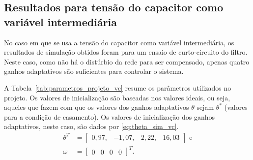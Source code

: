   \newpage

  \vfill
  \noindent
  \begin{minipage}{\textwidth}
    \makebox[\textwidth]{
      \centering
      \def\svgwidth{\textwidth}
      }
    \label{fig:up_sim_Lg}
  \end{minipage}

  \vfill
  \noindent
  \begin{minipage}{\textwidth}
    \makebox[\textwidth]{
      \centering
      \def\svgwidth{\textwidth}
      }
    \label{fig:thetas_sim_Lg}
  \end{minipage}

  \vfill

  \newpage

  \subsection{Resultados para tensão do capacitor como variável intermediária}

  No caso em que se usa a tensão do capacitor como variável intermediária, os resultados de simulação obtidos foram para um ensaio de curto-circuito do filtro. Neste caso, como não há o distúrbio da rede para ser compensado, apenas quatro ganhos adaptativos são suficientes para controlar o sistema.

  A Tabela~\ref{tab:parametros_projeto_vc} resume os parâmetros utilizados no projeto. Os valores de inicialização são baseadas nos valores ideais, ou seja, aqueles que fazem com que os valores dos ganhos adaptativos $\theta$ sejam $\theta^*$ (valores para a condição de casamento). Os valores de inicialização dos ganhos adaptativos, neste caso, são dados por \ref{eq:theta_sim_vc}.
  \begin{equation}
    \begin{split}
      \theta^T & = \left[ \begin{matrix} 0,97, & -1,07, & 2,22, & 16,03 \end{matrix} \right]\text{ e}\\
      \omega & = {\left[ \begin{matrix} 0 & 0 & 0 & 0 \end{matrix} \right]}^T\text{.}
    \end{split}
    \label{eq:theta_sim_vc}
  \end{equation}

